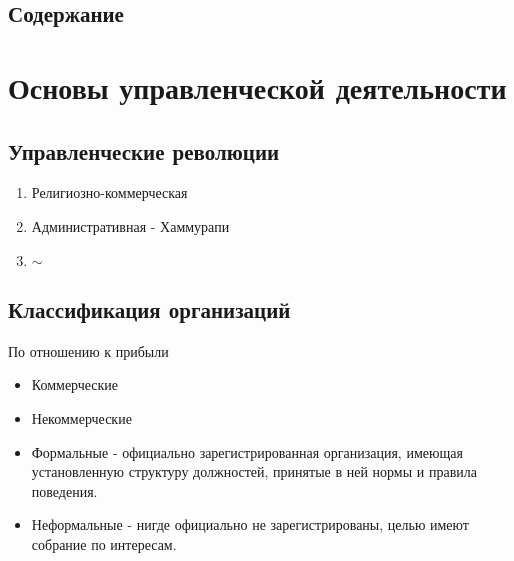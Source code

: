 \documentclass[a4paper,12pt]{report}
\begin{document}
	\sloppy

	\def \LineB {Конспект по дисциплине}
	\def \LineC {“Основы современного управления”}
	\def \LineD {\vspace{2cm}}
	\def \nocredits {}

\maketitle

\subsection*{Содержание}
\maketoc






\section{Основы управленческой деятельности}


\subsection{Управленческие революции}

	\begin{enumerate}
		\item	Религиозно-коммерческая
		\item	Административная - Хаммурапи
		\item	$\sim$
	\end{enumerate}



\subsection{Классификация организаций}

	По отношению к прибыли
	\begin{itemize}
		\item	Коммерческие
		\item	Некоммерческие
	\end{itemize}

	\begin{itemize}
		\item	Формальные - официально зарегистрированная организация, имеющая установленную структуру
			должностей, принятые в ней нормы и правила поведения.
		\item	Неформальные - нигде официально не зарегистрированы, целью имеют собрание по интересам.
	\end{itemize}
\end{document}
